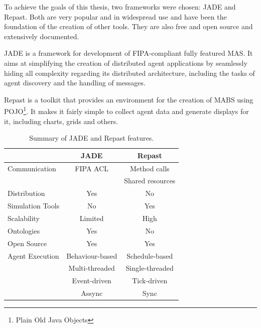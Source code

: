 To achieve the goals of this thesis, two frameworks were chosen: JADE and Repast. Both are very popular and in widespread use and have been the foundation of the creation of other tools. They are also free and open source and extensively documented.

JADE is a framework for development of FIPA-compliant fully featured MAS. It aims at simplifying the creation of distributed agent applications by seamlessly hiding all complexity regarding its distributed architecture, including the tasks of agent discovery and the handling of messages.

Repast is a toolkit that provides an environment for the creation of MABS using POJO\footnote{Plain Old Java Objects}. It makes it fairly simple to collect agent data and generate displays for it, including charts, grids and others.

\begin{table}[h]
	\caption{Summary of JADE and Repast features.}
	\label{tab:jadevsrep}
	\begin{center}
		\begin{tabular}{l|cc}
		\hline

		\hline
		\textbf{} & \textbf{JADE} & \textbf{Repast} \\ %
		\hline
			Communication & FIPA ACL &  Method calls  \\ %
						  &			 &  Shared resources \\
		\hline
			Distribution & Yes & No \\ %
		\hline
			Simulation Tools & No & Yes \\ %
		\hline
			Scalability & Limited & High \\ %
		\hline
			Ontologies & Yes & No \\ %
		\hline
			Open Source & Yes & Yes \\ %
		\hline
			Agent Execution & Behaviour-based & Schedule-based  \\ %
							& Multi-threaded & Single-threaded \\ %
							& Event-driven   & Tick-driven 	   \\ %
							& Assync		 & Sync 		   \\ %
		\hline
		\end{tabular}
	\end{center}
\end{table}

